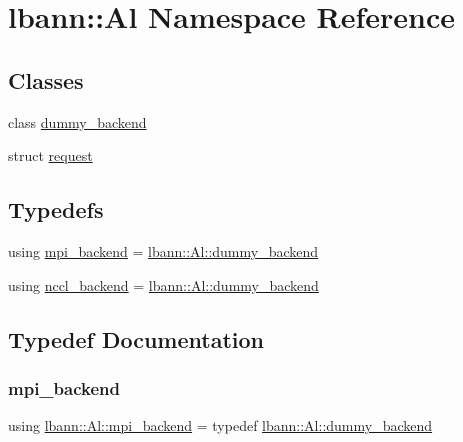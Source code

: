 \hypertarget{namespacelbann_1_1Al}{}\section{lbann\+:\+:Al Namespace Reference}
\label{namespacelbann_1_1Al}
\subsection*{Classes}
\begin{DoxyCompactItemize}
\item 
class \hyperlink{classlbann_1_1Al_1_1dummy__backend}{dummy\+\_\+backend}
\item 
struct \hyperlink{structlbann_1_1Al_1_1request}{request}
\end{DoxyCompactItemize}
\subsection*{Typedefs}
\begin{DoxyCompactItemize}
\item 
using \hyperlink{namespacelbann_1_1Al_a8a69c2fac7e1117883fff1903c2232ce}{mpi\+\_\+backend} = \hyperlink{classlbann_1_1Al_1_1dummy__backend}{lbann\+::\+Al\+::dummy\+\_\+backend}
\item 
using \hyperlink{namespacelbann_1_1Al_acac3d42323b313e89a60a27f00554661}{nccl\+\_\+backend} = \hyperlink{classlbann_1_1Al_1_1dummy__backend}{lbann\+::\+Al\+::dummy\+\_\+backend}
\end{DoxyCompactItemize}


\subsection{Typedef Documentation}
\mbox{\label{namespacelbann_1_1Al_a8a69c2fac7e1117883fff1903c2232ce}} 
\subsubsection{\texorpdfstring{mpi\+\_\+backend}{mpi\_backend}}
{\footnotesize\ttfamily using \hyperlink{namespacelbann_1_1Al_a8a69c2fac7e1117883fff1903c2232ce}{lbann\+::\+Al\+::mpi\+\_\+backend} = typedef \hyperlink{classlbann_1_1Al_1_1dummy__backend}{lbann\+::\+Al\+::dummy\+\_\+backend}}



